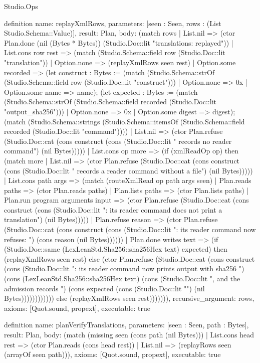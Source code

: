 \begin{lexlean}{Studio.Ops}
\begin{semanticmodule}
{definition{
  name: replayXmlRows,
  parameters: [seen : Seen, rows : (List Studio.Schema::Value)],
  result: Plan,
  body: (match rows
    | List.nil => (ctor Plan.done (nil (Bytes * Bytes)) (Studio.Doc::lit "translations: replayed\n"))
    | List.cons row rest => (match (Studio.Schema::field row (Studio.Doc::lit "translation"))
      | Option.none => (replayXmlRows seen rest)
      | Option.some recorded => (let construct : Bytes := (match (Studio.Schema::strOf (Studio.Schema::field row (Studio.Doc::lit "construct")))
          | Option.none => 0x
          | Option.some name => name); (let expected : Bytes := (match (Studio.Schema::strOf (Studio.Schema::field recorded (Studio.Doc::lit "output_sha256")))
          | Option.none => 0x
          | Option.some digest => digest); (match (Studio.Schema::strings (Studio.Schema::itemsOf (Studio.Schema::field recorded (Studio.Doc::lit "command"))))
          | List.nil => (ctor Plan.refuse (Studio.Doc::cat (cons construct (cons (Studio.Doc::lit " records no reader command\n") (nil Bytes)))))
          | List.cons op more => (if (xmlReadOp op) then (match more
            | List.nil => (ctor Plan.refuse (Studio.Doc::cat (cons construct (cons (Studio.Doc::lit " records a reader command without a file\n") (nil Bytes)))))
            | List.cons path args => (match (routeXmlRead op path args seen)
              | Plan.reads paths => (ctor Plan.reads paths)
              | Plan.lists paths => (ctor Plan.lists paths)
              | Plan.run program arguments input => (ctor Plan.refuse (Studio.Doc::cat (cons construct (cons (Studio.Doc::lit ": its reader command does not print a translation\n") (nil Bytes)))))
              | Plan.refuse reason => (ctor Plan.refuse (Studio.Doc::cat (cons construct (cons (Studio.Doc::lit ": its reader command now refuses: ") (cons reason (nil Bytes))))))
              | Plan.done writes text => (if (Studio.Doc::same (LexLeanStd.Sha256::sha256Hex text) expected) then (replayXmlRows seen rest) else (ctor Plan.refuse (Studio.Doc::cat (cons construct (cons (Studio.Doc::lit ": its reader command now prints output with sha256 ") (cons (LexLeanStd.Sha256::sha256Hex text) (cons (Studio.Doc::lit ", and the admission records ") (cons expected (cons (Studio.Doc::lit "\n") (nil Bytes)))))))))))) else (replayXmlRows seen rest))))))),
  recursive_argument: rows,
  axioms: [Quot.sound, propext],
  executable: true
}

definition{
  name: planVerifyTranslations,
  parameters: [seen : Seen, path : Bytes],
  result: Plan,
  body: (match (missing seen (cons path (nil Bytes)))
    | List.cons head rest => (ctor Plan.reads (cons head rest))
    | List.nil => (replayRows seen (arrayOf seen path))),
  axioms: [Quot.sound, propext],
  executable: true
}

}
\end{semanticmodule}
\end{lexlean}
